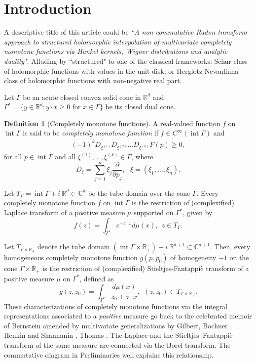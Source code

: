 \documentclass[11pt,reqno]{amsart}
\theoremstyle{plain}
\theoremstyle{definition}
\newtheorem{definition}[theorem]{Definition}
\numberwithin{equation}{section}
\begin{document}
	\section{Introduction}
	A descriptive title of this article could be {\it ``A non-commutative Radon transform approach to structured holomorphic interpolation of multivariate completely monotone functions via Hankel kernels, Wigner distributions and analytic duality"}. Alluding by ``structured" to one of the classical frameworks: Schur class of holomorphic functions with values in the unit disk, or Herglotz-Nevanlinna class of holomorphic functions with non-negative real part.
	
	Let $\Gamma$ be an acute closed convex solid cone in $\mathbb{R}^d$ and $\Gamma^*= \{ y\in \mathbb{R}^d : y\cdot x \geq 0 \text{ for } x\in \Gamma\}$ be its closed dual cone.
    \begin{definition}[Completely monotone functions]
		A real-valued function $f$ on $\operatorname{int} \Gamma$ is said to be {\em completely monotone function} if $f \in C^\infty(\operatorname{int} \Gamma)$ and 
	\begin{align}\label{Eq:CM-cond}
			(-1)^k D_{\xi^{(1)}} D_{\xi^{(2)}} \dots D_{\xi^{(k)}} F(p) \geq 0,
		\end{align}
		for all $p\in \operatorname{int} \Gamma$ and all $\xi^{(1)}, \dots, \xi^{(k)} \in \Gamma$, where
		$$
		D_{\xi} = \sum_{j=1}^{n} \xi_j \frac{\partial}{\partial p_j}, \ \ \ \xi=(\xi_1, \dots, \xi_n).
		$$
\end{definition}
Let $T_\Gamma = \operatorname{int} \Gamma + i  \ {\mathbb R}^d \subset \mathbb{C}^d$ be the tube domain over the cone $\Gamma$. Every completely monotone function $f$ on $\operatorname{int} \Gamma$ is the restriction of (complexified) Laplace transform of a positive measure $\mu$ supported on $\Gamma^*$, given by
$$ f(z) = \int_{\Gamma^\ast} e^{- z \cdot x} d\mu(x), \ \ z \in T_\Gamma.$$

Let $T_{\Gamma \times \mathbb{R}_+}$ denote the tube domain $(\operatorname{int} \Gamma \times \mathbb{R}_+) + i\ \mathbb{R}^{d+1} \subset \mathbb{C}^{d+1}$. Then, every homogeneous completely monotone function $g(p, p_0)$  of homogeneity $-1$ on the cone $\Gamma \times \mathbb{R}_+$ is the restriction of (complexified) Stieltjes-Fantappi\`e transform of a positive measure $\mu$ on $\Gamma^*$, defined as
$$ 
g(z,z_0) = \int_{\Gamma^\ast} \frac {d\mu(x)}{z_0 + z\cdot x}, \ \ (z, z_0) \in T_{\Gamma \times \mathbb{R}_+}.
$$
These characterizations of completely monotone functions via the integral representations associated to a {\it positive} measure go back to the celebrated memoir of Bernstein \cite{Bernstein} amended by multivariate generalizations by Gilbert, Bochner \cite{Bochner}, Henkin and Shannanin \cite{HS}, Thomas \cite{Thomas}.
The Laplace and the Stieltjes–Fantappi\`e transform of the same measure are connected via the Borel transform. The commutative diagram in Preliminaries well explains this relationship. 
\end{document}
